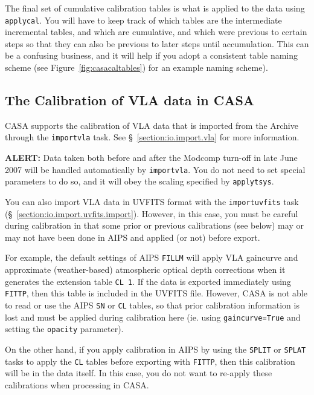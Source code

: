 The final set of cumulative calibration tables is what is applied
to the data using {\tt applycal}.  You will have to keep track of
which tables are the intermediate incremental tables, and which
are cumulative, and which were previous to certain steps so that
they can also be previous to later steps until accumulation.  This
can be a confusing business, and it will help if you adopt a
consistent table naming scheme (see Figure~\ref{fig:casacaltables})
for an example naming scheme).


\subsection{The Calibration of VLA data in CASA}
\label{section:cal.flow.vla}

CASA supports the calibration of VLA data that is 
imported from the Archive through the {\tt importvla} task.
See \S~\ref{section:io.import.vla} for more information.

{\bf ALERT:} Data taken both before and after the Modcomp turn-off in
late June 2007 will be handled automatically by {\tt importvla}.  You
do not need to set special parameters to do so, and it will obey the
scaling specified by {\tt applytsys}.

You can also import VLA data in UVFITS format with the 
{\tt importuvfits} task (\S~\ref{section:io.import.uvfits.import}).
However, in this case, you must be careful during calibration in
that some prior or previous calibrations (see below) may or may not
have been done in AIPS and applied (or not) before export.

For example, the default settings of AIPS {\tt FILLM} will apply
VLA gaincurve and approximate (weather-based) atmospheric optical
depth corrections when it generates the extension table {\tt CL 1}.
If the data is exported immediately using {\tt FITTP}, then this 
table is included in the UVFITS file.  However, CASA is not able
to read or use the AIPS {\tt SN} or {\tt CL} tables, so that 
prior calibration information is lost and must be applied during
calibration here (ie. using {\tt gaincurve=True} and setting the
{\tt opacity} parameter).  

On the other hand, if you apply calibration in AIPS by using the
{\tt SPLIT} or {\tt SPLAT} tasks to apply the {\tt CL} tables before
exporting with {\tt FITTP}, then this calibration will be in the
data itself.  In this case, you do not want to re-apply these
calibrations when processing in CASA.


